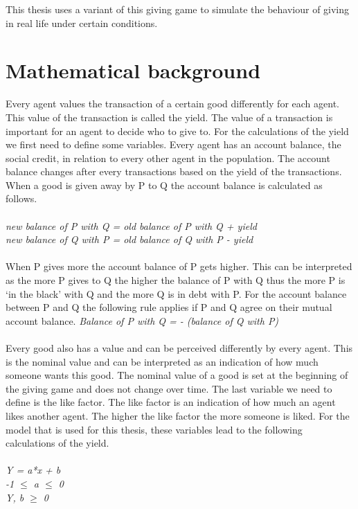 \documentclass[twoside,openright]{uva-bachelor-thesis}
\begin{document}
This thesis uses a variant of this giving game to simulate the behaviour of giving in real life under certain conditions.

\section{Mathematical background}
Every agent values the transaction of a certain good differently for each agent. This value of the transaction is called the yield. The value of a transaction is important for an agent to decide who to give to. For the calculations of the yield we first need to define some variables. Every agent has an account balance, the social credit, in relation to every other agent in the population. The account balance changes after every transactions based on the yield of the transactions. When a good is given away by P to Q the account balance is calculated as follows.\\
\\
\textit{new balance of P with Q = old balance of P with Q + yield} \\
\textit{new balance of Q with P = old balance of Q with P - yield} \\
\\
When P gives more the account balance of P gets higher. This can be interpreted as the more P gives to Q the higher the balance of P with Q thus the more P is ‘in the black’ with Q and the more Q is in debt with P. 
For the account balance between P and Q the following rule applies if P and Q agree on their mutual account balance.
\textit{Balance of P with Q = - (balance of Q with P)}
\\
\\
Every good also has a value and can be perceived differently by every agent. This is the nominal value and can be interpreted as an indication of how much someone wants this good. The nominal value of a good is set at the beginning of the giving game and does not change over time. The last variable we need to define is the like factor. The like factor is an indication of how much an agent likes another agent. The higher the like factor the more someone is liked.
For the model that is used for this thesis, these variables lead to the following calculations of the yield.
\\
\\
\textit{Y = a*x + b} \\
\textit{-1 $\le$ a $\le$ 0} \\
\textit{Y, b $\ge$ 0} \\
\end{document}
